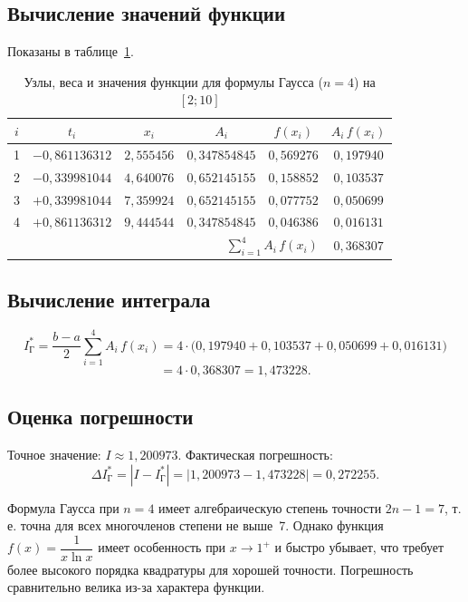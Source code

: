 \documentclass[a4paper, final]{article}
\begin{document}
\subsection{Вычисление значений функции}
Показаны в таблице~\ref{tab:gauss_calc}.

\begin{table}[h!]
\centering
\caption{Узлы, веса и значения функции для формулы Гаусса ($n=4$) на $[2; 10]$}
\label{tab:gauss_calc}
\renewcommand{\arraystretch}{1.3}
\begin{tabular}{|c|c|c|c|c|c|}
\hline
$i$ & $t_i$ & $x_i$ & $A_i$ & $f(x_i)$ & $A_i\,f(x_i)$ \\
\hline
1 & $-0{,}861136312$ & $2{,}555456$ & $0{,}347854845$ & $0{,}569276$ & $0{,}197940$ \\
2 & $-0{,}339981044$ & $4{,}640076$ & $0{,}652145155$ & $0{,}158852$ & $0{,}103537$ \\
3 & $+0{,}339981044$ & $7{,}359924$ & $0{,}652145155$ & $0{,}077752$ & $0{,}050699$ \\
4 & $+0{,}861136312$ & $9{,}444544$ & $0{,}347854845$ & $0{,}046386$ & $0{,}016131$ \\
\hline
\multicolumn{5}{|r|}{$\displaystyle\sum_{i=1}^{4} A_i\,f(x_i)$} & $0{,}368307$ \\
\hline
\end{tabular}
\end{table}

\subsection{Вычисление интеграла}

\[
I^*_\text{Г} = \frac{b-a}{2}\sum_{i=1}^{4}A_i\,f(x_i)
= 4\cdot\bigl(0{,}197940+0{,}103537+0{,}050699+0{,}016131\bigr)
\]
\[
= 4\cdot 0{,}368307 = 1{,}473228.
\]

\subsection{Оценка погрешности}

Точное значение: $I \approx 1{,}200973$. Фактическая погрешность:
\[
\Delta I^*_\text{Г} = |I - I^*_\text{Г}| = |1{,}200973 - 1{,}473228| = 0{,}272255.
\]

Формула Гаусса при $n=4$ имеет алгебраическую степень точности $2n-1=7$,
т.\,е. точна для всех многочленов степени не выше~7. Однако функция
$f(x) = \dfrac{1}{x\ln x}$ имеет особенность при $x \to 1^+$ и быстро
убывает, что требует более высокого порядка квадратуры для хорошей точности.
Погрешность сравнительно велика из-за характера функции.
\end{document}
